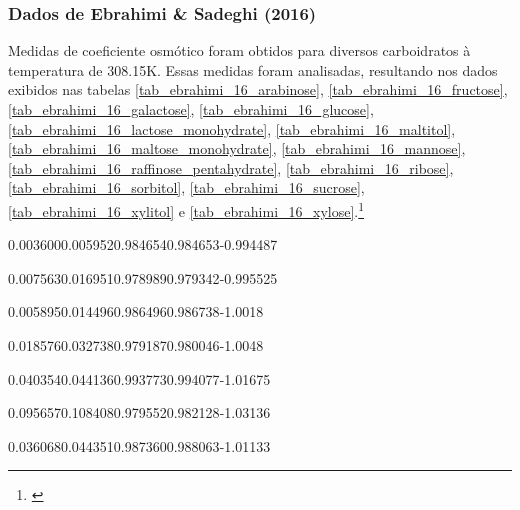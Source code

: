 \FloatBarrier

\subsubsection{Dados de Ebrahimi \& Sadeghi (2016)}

Medidas de coeficiente osmótico foram obtidos para diversos carboidratos à
temperatura de 308.15K. Essas medidas foram analisadas, resultando nos dados
exibidos nas tabelas \ref{tab_ebrahimi_16_arabinose},
\ref{tab_ebrahimi_16_fructose}, \ref{tab_ebrahimi_16_galactose},
\ref{tab_ebrahimi_16_glucose}, \ref{tab_ebrahimi_16_lactose_monohydrate},
\ref{tab_ebrahimi_16_maltitol}, \ref{tab_ebrahimi_16_maltose_monohydrate},
\ref{tab_ebrahimi_16_mannose}, \ref{tab_ebrahimi_16_raffinose_pentahydrate},
\ref{tab_ebrahimi_16_ribose}, \ref{tab_ebrahimi_16_sorbitol},
\ref{tab_ebrahimi_16_sucrose}, \ref{tab_ebrahimi_16_xylitol} e
\ref{tab_ebrahimi_16_xylose}.\footnote{\cite{ebrahimi2016}}

%
	{0.003600}{0.005952}{0.984654}{0.984653}{-0.994487}

%
	{0.007563}{0.016951}{0.978989}{0.979342}{-0.995525}

%
	{0.005895}{0.014496}{0.986496}{0.986738}{-1.0018}

%
	{0.018576}{0.032738}{0.979187}{0.980046}{-1.0048}

%
	{0.040354}{0.044136}{0.993773}{0.994077}{-1.01675}

%
	{0.095657}{0.108408}{0.979552}{0.982128}{-1.03136}

%
	{0.036068}{0.044351}{0.987360}{0.988063}{-1.01133}

